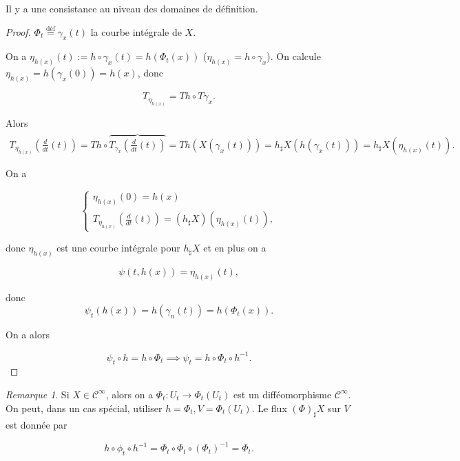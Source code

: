 \documentclass[french]{article}
\theoremstyle{definition}
\theoremstyle{remark}
\newtheorem*{remark}{Remarque}
\begin{document}
Il y a une consistance au niveau des domaines de définition.


\begin{proof}
  \(\Phi_t \stackrel{\text{déf}}{=} \gamma_x(t)\) la courbe intégrale de \(X\).

  On a \(\eta _{h(x)}(t) := h \circ \gamma_x(t) = h(\Phi_t(x))\) (\(\eta _{h(x)} = h \circ \gamma_x\)). On calcule \(\eta _{h(x)} = h(\gamma_x(0)) = h(x)\), donc

  \[T _{\eta _{h(x)}} = T h \circ T \gamma_x.\]

  Alors
  \begin{gather*}
    T _{\eta _{h(x)}}\left(\frac{d}{dt}(t)\right) = T h \circ \overbrace{T _{\gamma_x}\left(\frac{d}{dt}(t)\right)}^{} = Th(X (\gamma_x(t))) = h _{\sharp}X(h(\gamma_x(t))) = h _{\sharp}X(\eta _{h(x)}(t)).
  \end{gather*}

  On a

  \[\begin{cases}
    \eta _{h(x)}(0) = h(x) \\
    T _{\eta _{h(x)}}\left(\frac{d}{dt}(t)\right) = (h _{\sharp}X)(\eta _{h(x)}(t)),
  \end{cases}\]

  donc \(\eta _{h(x)}\) est une courbe intégrale pour \(h _{\sharp}X\) et en plus on a

  \[\psi(t,h(x)) = \eta _{h(x)}(t),\]

  donc \[\psi_t(h(x)) = h(\gamma_n(t)) = h(\Phi_t(x)).\]

  On a alors

  \begin{equation}
    \psi_t \circ h = h \circ \Phi_t \implies \psi_t = h \circ \Phi_t \circ h^{-1}.
  \end{equation}
\end{proof}


\begin{remark}
  Si \(X \in \mathcal{C}^{\infty}\), alors on a  \(\Phi_t : U_t \longrightarrow \Phi_t(U_t)\) est un difféomorphisme \(\mathcal{C}^\infty\). On peut, dans un cas spécial, utiliser \(h = \Phi_t, V=\Phi_t(U_t)\). Le flux \((\Phi)_{\sharp}X\) sur \(V\) est donnée par

  \begin{equation}\label{miracle}
    h \circ \phi_t \circ h ^{-1} = \Phi_t \circ \Phi_t \circ (\Phi_t)^{-1} = \Phi_t.
  \end{equation}
\end{remark}
\end{document}
